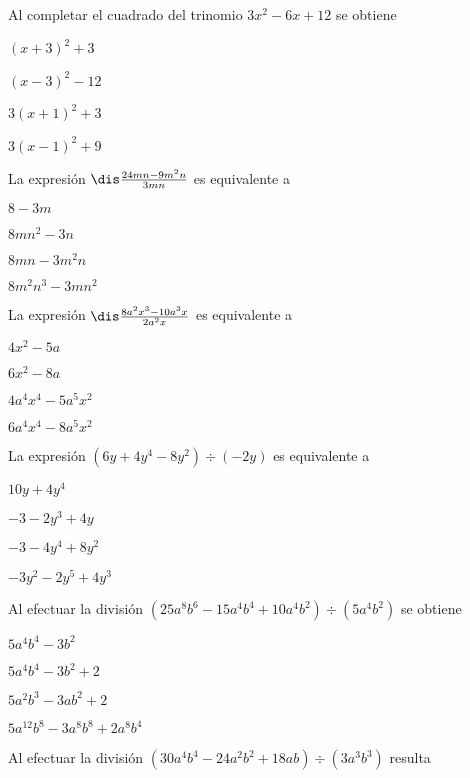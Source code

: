 \documentclass[12pt, fleqn]{article}
\begin{document}
\item Al completar el cuadrado del trinomio $3x^2-6x+12$ se obtiene \vp

\benu
\item[] \opc $(x+3)^2+3$ \vp
\item[] \opc $(x-3)^2-12$ \vp
\item[] \opc $3(x+1)^2+3$ \vp
\item[] \opc $3(x-1)^2+9$
\eenu
\vs

\item La expresión $\dis\frac{24mn-9m^2n}{3mn}$ es equivalente a \vp

\benu
\item[] \opc $8-3m$ \vp
\item[] \opc $8mn^2-3n$ \vp
\item[] \opc $8mn-3m^2n$ \vp
\item[] \opc $8m^2n^3-3mn^2$
\eenu\vs

\item La expresión $\dis\frac{8a^2x^3-10a^3x}{2a^2x}$ es equivalente a \vp

\benu
\item[] \opc $4x^2-5a$ \vp
\item[] \opc $6x^2-8a$ \vp
\item[] \opc $4a^4x^4-5a^5x^2$ \vp
\item[] \opc $6a^4x^4-8a^5x^2$
\eenu\vs

\pagebreak

\item La expresión $(6y+4y^4-8y^2)\div(-2y)$ es equivalente a \vp

\benu
\item[] \opc $10y+4y^4$ \vp
\item[] \opc $-3-2y^3+4y$ \vp
\item[] \opc $-3-4y^4+8y^2$ \vp
\item[] \opc $-3y^2-2y^5+4y^3$
\eenu\vs

\item Al efectuar la división $(25a^8b^6-15a^4b^4+10a^4b^2)\div (5a^4b^2)$ se obtiene
\vp

\benu
\item[] \opc $5a^4b^4-3b^2$ \vp
\item[] \opc $5a^4b^4-3b^2+2$ \vp
\item[] \opc $5a^2b^3-3ab^2+2$ \vp
\item[] \opc $5a^{12}b^8-3a^8b^8+2a^8b^4$
\eenu\vs

\item Al efectuar la división $(30a^4b^4-24a^2b^2+18ab) \div (3a^3b^3)$ resulta
\vp
\end{document}
